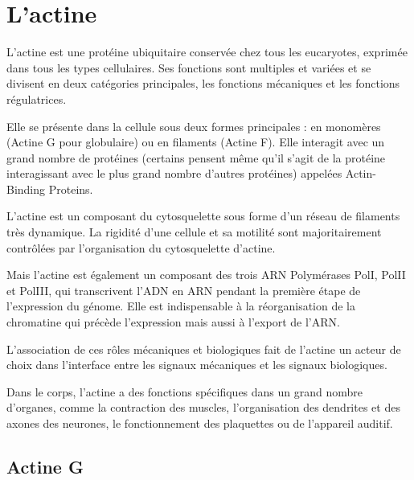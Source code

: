 %
%
%

%
\chapter{L'actine}

L'actine est une protéine ubiquitaire conservée chez tous les eucaryotes, exprimée dans tous les types cellulaires. 
Ses fonctions sont multiples et variées et se divisent en deux catégories principales, les fonctions mécaniques et les fonctions régulatrices. 

Elle se présente dans la cellule sous deux formes principales : en monomères (Actine G pour globulaire) ou en filaments (Actine F). 
Elle interagit avec un grand nombre de protéines (certains pensent même qu'il s'agit de la protéine interagissant avec le plus grand nombre d'autres protéines) appelées Actin-Binding Proteins. 

L'actine est un composant du cytosquelette sous forme d'un réseau de filaments très dynamique. La rigidité d'une cellule et sa motilité sont majoritairement contrôlées par l'organisation du cytosquelette d'actine. 

Mais l'actine est également un composant des trois ARN Polymérases PolI, PolII et PolIII, qui transcrivent l'ADN en ARN pendant la première étape de l'expression du génome. 
Elle est indispensable à la réorganisation de la chromatine qui précède l'expression mais aussi à l'export de l'ARN.  

L'association de ces rôles mécaniques et biologiques fait de l'actine un acteur de choix dans l'interface entre les signaux mécaniques et les signaux biologiques. 

Dans le corps, l'actine a des fonctions spécifiques dans un grand nombre d'organes, comme la contraction des muscles, l'organisation des dendrites et des axones des neurones, le fonctionnement des plaquettes ou de l'appareil auditif. 



\section{Actine G}

